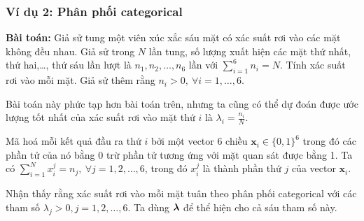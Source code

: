 \subsubsection{Ví dụ 2: Phân phối categorical}

\textbf{Bài toán:} Giả sử tung một viên xúc xắc sáu mặt có xác suất rơi vào các
mặt không đều nhau. Giả sử trong $N$ lần tung, số lượng xuất hiện các mặt
thứ nhất, thứ hai,\dots, thứ sáu lần lượt là $n_1, n_2, \dots, n_6$ lần với
$\displaystyle \sum_{i=1}^6 n_i = N$. Tính xác suất rơi vào mỗi mặt. Giả sử thêm rằng $n_i > 0, ~\forall i = 1, \dots, 6.$

\lg

Bài toán này phức tạp hơn bài toán trên, nhưng ta cũng có thể dự
đoán được ước lượng tốt nhất của xác suất rơi vào mặt thứ $i$ là $\lambda_i =
\frac{n_i}{N}$.

{Mã hoá} mỗi kết quả đầu ra thứ $i$ bởi một vector 6 chiều $\mathbf{x}_i
\in \{0, 1\}^6$ trong đó các phần tử của nó bằng 0 trừ phần tử tương ứng với mặt
quan sát được bằng 1. Ta có
$\sum_{i=1}^N x^j_i = n_j, ~ \forall j = 1, 2, \dots, 6$,
trong đó $x^j_i$ là thành phần thứ $j$ của vector $\mathbf{x}_i$.

Nhận thấy rằng xác suất rơi vào mỗi mặt tuân theo phân phối categorical với
các tham số $\lambda_j > 0, j = 1, 2, \dots, 6$. Ta dùng $\boldsymbol{\lambda}$ để thể hiện
cho cả sáu tham số này.

